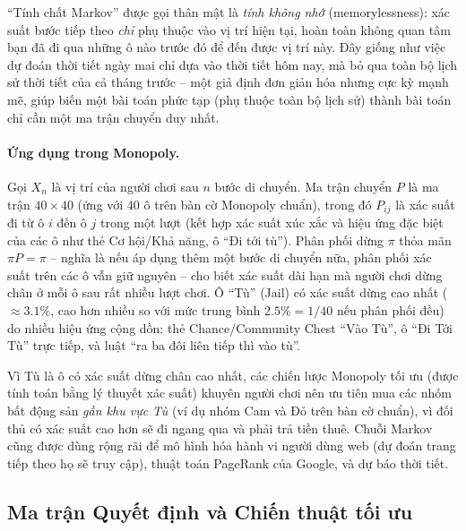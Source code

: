 \documentclass[12pt,a4paper]{article}
\theoremstyle{coloredthm}
\theoremstyle{coloreddef}
\theoremstyle{remark}
\begin{document}
\begin{giaithich}
``Tính chất Markov'' được gọi thân mật là \emph{tính không nhớ} (memorylessness): xác suất bước tiếp theo \emph{chỉ} phụ thuộc vào vị trí hiện tại, hoàn toàn không quan tâm bạn đã đi qua những ô nào trước đó để đến được vị trí này. Đây giống như việc dự đoán thời tiết ngày mai chỉ dựa vào thời tiết hôm nay, mà bỏ qua toàn bộ lịch sử thời tiết của cả tháng trước -- một giả định đơn giản hóa nhưng cực kỳ mạnh mẽ, giúp biến một bài toán phức tạp (phụ thuộc toàn bộ lịch sử) thành bài toán chỉ cần một ma trận chuyển duy nhất.
\end{giaithich}

\paragraph{Ứng dụng trong Monopoly.} Gọi $X_n$ là vị trí của người chơi sau $n$ bước di chuyển. Ma trận chuyển $P$ là ma trận $40 \times 40$ (ứng với $40$ ô trên bàn cờ Monopoly chuẩn), trong đó $P_{ij}$ là xác suất đi từ ô $i$ đến ô $j$ trong một lượt (kết hợp xác suất xúc xắc và hiệu ứng đặc biệt của các ô như thẻ Cơ hội/Khả năng, ô ``Đi tới tù''). Phân phối dừng $\pi$ thỏa mãn $\pi P = \pi$ -- nghĩa là nếu áp dụng thêm một bước di chuyển nữa, phân phối xác suất trên các ô vẫn giữ nguyên -- cho biết xác suất dài hạn mà người chơi dừng chân ở mỗi ô sau rất nhiều lượt chơi. Ô ``Tù'' (Jail) có xác suất dừng cao nhất ($\approx 3.1\%$, cao hơn nhiều so với mức trung bình $2.5\% = 1/40$ nếu phân phối đều) do nhiều hiệu ứng cộng dồn: thẻ Chance/Community Chest ``Vào Tù'', ô ``Đi Tới Tù'' trực tiếp, và luật ``ra ba đôi liên tiếp thì vào tù''.

\begin{ungdung}
Vì Tù là ô có xác suất dừng chân cao nhất, các chiến lược Monopoly tối ưu (được tính toán bằng lý thuyết xác suất) khuyên người chơi nên ưu tiên mua các nhóm bất động sản \emph{gần khu vực Tù} (ví dụ nhóm Cam và Đỏ trên bàn cờ chuẩn), vì đối thủ có xác suất cao hơn sẽ đi ngang qua và phải trả tiền thuê. Chuỗi Markov cũng được dùng rộng rãi để mô hình hóa hành vi người dùng web (dự đoán trang tiếp theo họ sẽ truy cập), thuật toán PageRank của Google, và dự báo thời tiết.
\end{ungdung}

\subsection{Ma trận Quyết định và Chiến thuật tối ưu}
\end{document}
